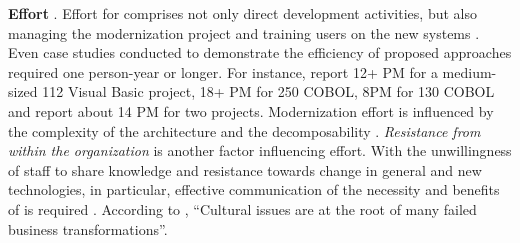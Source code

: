 \textbf{Effort} \autocite[cf.][def. 3.1350]{ISO/IEEE24765Vocabulary}. Effort  for  comprises not only direct development activities, but also managing the modernization project and training users on the new systems \autocite{ISO/IEEE2006SoftwareLifeCycle,Sneed2010SoftwareMigration,Seacord2003ModernizingLS}.
Even case studies conducted to demonstrate the efficiency of proposed  approaches required one person-year or longer.
For instance, \citet{Distante2006CaseStudy} report 12+ PM for a medium-sized 112  Visual Basic project, \citet{Bernhart2012} 18+ PM for 250  COBOL, \citet{Aversano2001} 8PM for 130  COBOL and \citet{Maenhaut2015} report about 14 PM
for two projects.
Modernization effort is influenced by the complexity of the  architecture \autocite{Khadka2014ProfessionalsModernization} and the decomposability \autocite{Aversano2001,Lucia2006,Brodie1995Migrating}.
\emph{Resistance from within the organization} \autocite{Sneed2010ReMiP} is another factor influencing effort. With the unwillingness of staff to share knowledge and resistance towards change in general and new technologies, in particular, effective communication of the necessity and benefits of  is required \autocite{Khadka2014ProfessionalsModernization}.
According to \citet{Gartner2016Culture}, ``Cultural issues are at the root of many failed business transformations''.

